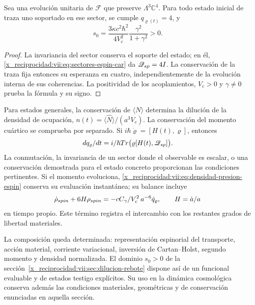 \begin{corollary}
\label{x_reciprocidad:vii:cor:dominio-positivo-conservado}
Sea una evolución unitaria de \(\mathcal F\) que preserve
\(\Lambda^3\mathbb C^4\). Para todo estado inicial de traza uno
soportado en ese sector, se cumple \(q_{\varrho(t)}=4\), y
\begin{equation}
 s_0=\frac{3\kappa c^2\hbar^2}{4V_c^2}
                   \frac{\gamma^2}{1+\gamma^2}>0.
 \label{x_reciprocidad:vii:eq:amplitud-positiva-sector-tres}
\end{equation}
\end{corollary}
\begin{proof}
La invariancia del sector conserva el soporte del estado; en él,
\eqref{x_reciprocidad:vii:eq:sectores-espin-car} da
\(\widehat{\mathscr Q}_{\rm sp}=4I\). La conservación de la
traza fija entonces su esperanza en cuatro, independientemente de
la evolución interna de sus coherencias. La positividad de los
acoplamientos, \(V_c>0\) y \(\gamma\ne0\) prueba la fórmula
y su signo.
\end{proof}

Para estados generales, la conservación de
\(\langle\widehat N\rangle\) determina la dilución de la densidad
de ocupación, \(n(t)=\langle\widehat N\rangle/(a^3V_c)\).
La conservación del momento cuártico se comprueba por separado.
Si \(i\hbar\dot\varrho=[H(t),\varrho]\), entonces
\begin{equation}
 \frac{\mathrm d q_\varrho}{\mathrm dt}
 =\frac{i}{\hbar}\operatorname{Tr}
       \bigl(\varrho[H(t),\widehat{\mathscr Q}_{\rm sp}]\bigr).
 \label{x_reciprocidad:vii:eq:conservacion-momento-cuartico}
\end{equation}
La conmutación, la invariancia de un sector donde el observable es
escalar, o una conservación demostrada para el estado concreto
proporcionan las condiciones pertinentes. Si el momento evoluciona,
\eqref{x_reciprocidad:vii:eq:densidad-presion-espin} conserva su evaluación
instantánea; su balance incluye
\[
 \dot\rho_{\rm spin}+6H\rho_{\rm spin}
 =-\frac{cC_\gamma}{V_c^2}\,a^{-6}\dot q_\varrho,
 \qquad H=\dot a/a
\]
en tiempo propio. Este término registra el intercambio con los
restantes grados de libertad materiales.

La composición queda determinada: representación espinorial del
transporte, acción material, corriente variacional, inversión de
Cartan--Holst, segundo momento y densidad normalizada. El dominio
\(s_0>0\) de la sección~\ref{x_reciprocidad:vii:sec:dilucion-rebote} dispone así
de un funcional evaluable y de estados testigo explícitos. Su uso en
la dinámica cosmológica conserva además las condiciones materiales,
geométricas y de conservación enunciadas en aquella sección.

